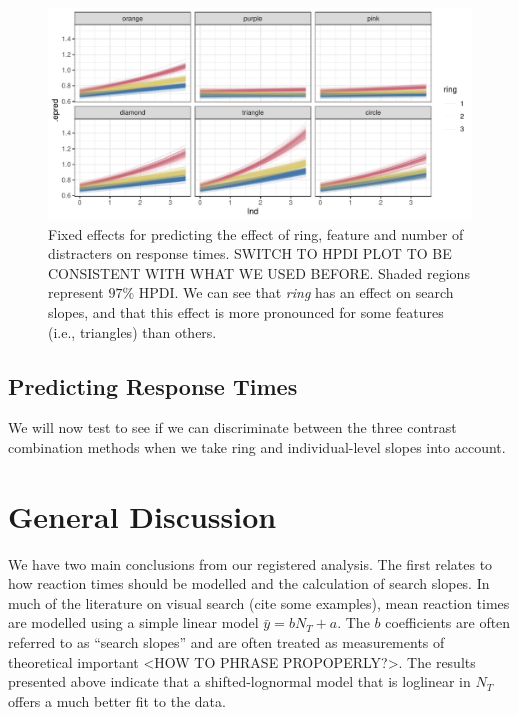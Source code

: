 \documentclass[preprint,12pt,authoryear]{elsarticle}
\begin{document}
\begin{figure}[ht]
\centering
\includegraphics[width=\textwidth]{../plots/ring_single_feature.pdf}
\caption{Fixed effects for predicting the effect of ring, feature and number of distracters on response times. SWITCH TO HPDI PLOT TO BE CONSISTENT WITH WHAT WE USED BEFORE. Shaded regions represent $97\%$ HPDI. We can see that \textit{ring} has an effect on search slopes, and that this effect is more pronounced for some features (i.e., triangles) than others.}
\label{fig:ring1}
\end{figure}


\subsection{Predicting Response Times}


We will now test to see if we can discriminate between the three contrast combination methods when we take ring and individual-level slopes into account.

\section{General Discussion}

We have two main conclusions from our registered analysis. The first relates to how reaction times should be modelled and the calculation of search slopes. In much of the literature on visual search (cite some examples), mean reaction times are modelled using a simple linear model $\bar{y} = b N_T + a$. The $b$ coefficients are often referred to as ``search slopes'' and are often treated as measurements of theoretical important <HOW TO PHRASE PROPOPERLY?>. The results presented above indicate that a shifted-lognormal model that is loglinear in $N_T$ offers a much better fit to the data.
\end{document}
